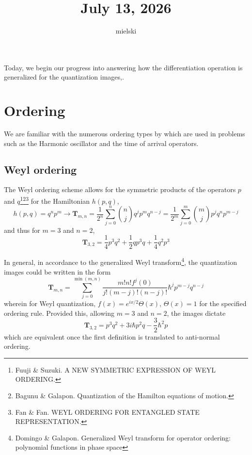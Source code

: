 \documentclass[a4paper]{article}
\title{July 13, 2026}
\author{mielski}
\begin{document}
	\maketitle
	Today, we begin our progress into answering how the differentiation operation is generalized for the quantization images,.
	\section{Ordering}
	We are familiar with the numerous ordering types by which are used in problems such as the Harmonic oscillator and the time of arrival operators.
	\subsection{Weyl ordering}
	The Weyl ordering scheme allows for the symmetric products of the operators $p$ and $q$\footnote{Fuuji \& Suzuki. A NEW SYMMETRIC EXPRESSION OF WEYL ORDERING. }\footnote{Bagunu \& Galapon. Quantization of the Hamilton equations of motion.}\footnote{Fan \& Fan. WEYL ORDERING FOR
		ENTANGLED STATE REPRESENTATION.} for the Hamiltonian $h(p,q)$,
	\begin{equation}
		h(p,q)=q^np^m\to\textbf{T}_{m,n}=\frac{1}{2^n}\sum_{j=0}^n\binom{n}{j}q^jp^mq^{n-j}=\frac{1}{2^m}\sum_{j=0}^m\binom{m}{j}p^jq^np^{m-j}
	\end{equation}
	and thus for $m=3$ and $n=2$,
	\begin{equation}
		\textbf{T}_{3,2}=\frac{1}{4}p^3q^2+\frac{1}{2}qp^3q+\frac{1}{4}q^2p^3
	\end{equation}
	
	In general, in accordance to the generalized Weyl transform\footnote{Domingo \& Galapon. Generalized Weyl transform for operator ordering: polynomial functions in phase space}, the quantization images could be written in the form
	\begin{equation}\label{eqn:images of gWt}
		\textbf{T}_{m,n}=\sum_{j=0}^{\min{(m,n)}}\frac{m!n!f^{j}(0)}{j!(m-j)!(n-j)!}\hbar^jp^{m-j}q^{n-j}
	\end{equation}
	wherein for Weyl quantization, $f(x)=e^{ix/2}\Theta(x)$, $\Theta(x)=1$ for the specified ordering rule.
	Provided this, allowing $m=3$ and $n=2$, the images dictate
	\begin{equation}
		\textbf{T}_{3,2}=p^3q^2+3i\hbar p^2q-\frac{3}{2}\hbar^2p 
	\end{equation}
	which are equivalent once the first definition is translated to anti-normal ordering.
\end{document}
